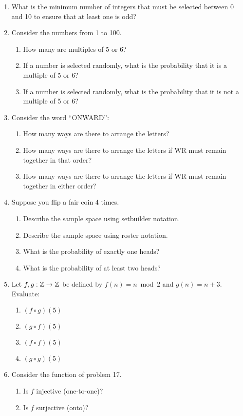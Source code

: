 \documentclass[letterpaper,12pt,fleqn]{article}
\begin{document}
\begin{enumerate}[left=0in]
\item What is the minimum number of integers that must be selected between 0 and 10 to ensure that at least one
  is odd?

\item Consider the numbers from 1 to 100.
  \begin{enumerate}
  \item How many are multiples of 5 or 6?
  \item If a number is selected randomly, what is the probability that it is a multiple of 5 or 6?
  \item If a number is selected randomly, what is the probability that it is not a multiple of 5 or 6?
  \end{enumerate}

\item Consider the word ``ONWARD'':
  \begin{enumerate}
  \item How many ways are there to arrange the letters?
  \item How many ways are there to arrange the letters if WR must remain together in that order?
  \item How many ways are there to arrange the letters if WR must remain together in either order?
  \end{enumerate}

\item Suppose you flip a fair coin 4 times.
  \begin{enumerate}
  \item Describe the sample space using setbuilder notation.
  \item Describe the sample space using roster notation.
  \item What is the probability of exactly one heads?
  \item What is the probability of at least two heads?
  \end{enumerate}

\item Let \(f,g:\mathbb{Z}\to\mathbb{Z}\) be defined by \(f(n)=n\bmod2\) and \(g(n)=n+3\).  Evaluate:
  \begin{enumerate}
  \item \((f\circ g)(5)\)
  \item \((g\circ f)(5)\)
  \item \((f\circ f)(5)\)
  \item \((g\circ g)(5)\)
  \end{enumerate}

\item Consider the function of problem 17.
  \begin{enumerate}
  \item Is \(f\) injective (one-to-one)?
  \item Is \(f\) surjective (onto)?
  \end{enumerate}


\end{enumerate}
\end{document}
